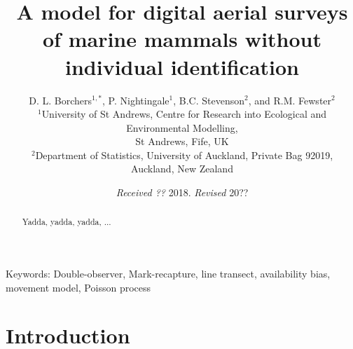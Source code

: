 \documentclass[useAMS, usenatbib, referee]{biom}\usepackage[]{graphicx}\usepackage[]{color}
\begin{document}
\title{A model for digital aerial surveys of marine mammals without individual identification}

\author{D. L. Borchers\(^{1, *}\),
P. Nightingale\(^1\),
B.C. Stevenson\(^{2}\), and
R.M. Fewster\(^{2}\) \\
\(^1\)University of St Andrews, Centre for Research into Ecological and Environmental Modelling, \\ St Andrews, Fife, UK \\
\(^2\)Department of Statistics, University of Auckland, Private Bag 92019, \\ Auckland, New Zealand
}




\date{{\it Received ??} 2018. {\it Revised } 20??}

\pagerange{\pageref{firstpage}--\pageref{lastpage}} 



\label{firstpage}


\begin{abstract}
Yadda, yadda, yadda, ...
\end{abstract}

\begin{keywords}
Keywords: Double-observer, Mark-recapture, line transect, availability bias, movement model, Poisson process
\end{keywords}


\maketitle

\section{Introduction}\label{sec:intro}
\end{document}

